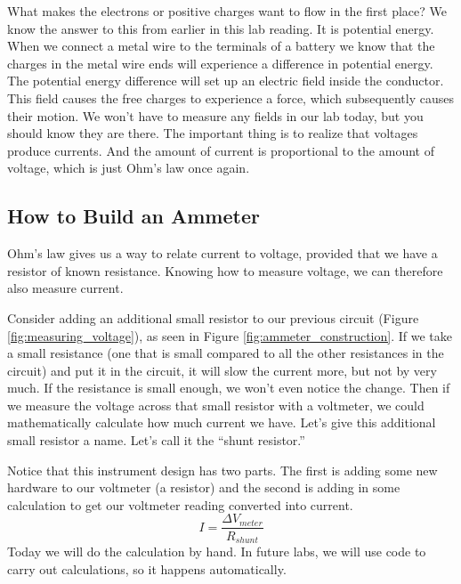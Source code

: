 What makes the electrons or positive charges want to flow in the first
place? We know the answer to this from earlier in this lab reading. It is
potential energy. When we connect a metal wire to the terminals of a battery
we know that the charges in the metal wire ends will experience a difference
in potential energy. The potential energy difference will set up an electric
field inside the conductor. 
This field causes the free charges to experience a force, which subsequently 
causes their motion. 
We won't have to measure any fields in our lab today, but you
should know they are there. The important thing is to realize that voltages
produce currents. And the amount of current is proportional to the amount of
voltage, which is just Ohm's law once again.
%

\subsection{How to Build an Ammeter}

Ohm's law gives us a way to relate current to voltage, provided that we
have a resistor of known resistance. Knowing how to measure voltage, we can
therefore also measure current.

Consider adding an additional small resistor to our previous circuit
(Figure \ref{fig:measuring_voltage}), as seen in 
Figure \ref{fig:ammeter_construction}. If
we take a small resistance (one that is small compared to all the other
resistances in the circuit) and put it in the circuit, it will slow
the current more, but not by very much. If the resistance is small enough, we
won't even notice the change. Then if we measure the voltage across that
small resistor with a voltmeter, we could mathematically calculate how much
current we have. 
Let's give this additional small resistor a name. Let's call it the
\textquotedblleft shunt resistor.\textquotedblright\ 

Notice that this instrument design has two parts. The first
is adding some new hardware to our voltmeter (a resistor) and the second is
adding in some calculation to get our voltmeter reading converted into
current. 
\begin{equation}
I=\frac{\Delta V_{meter}}{R_{shunt}}
\end{equation}
Today we will do the calculation by hand. In future labs, we will use code
to carry out calculations, so it happens automatically.

